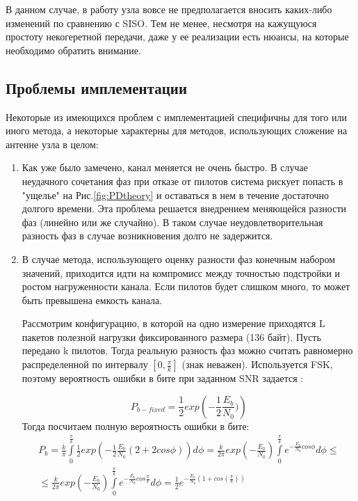 \documentclass[a4paper,12pt,oneside]{scrartcl}
\begin{document}
В данном случае, в работу узла вовсе не предполагается вносить каких-либо изменений по сравнению с SISO. Тем не менее, несмотря на кажущуюся простоту некогеретной передачи, даже у ее реализации есть нюансы, на которые необходимо обратить внимание.

\subsection{Проблемы имплементации}

Некоторые из имеющихся проблем с имплементацией специфичны для того или иного метода, а некоторые характерны для методов, использующих сложение на антенне узла в целом:
\begin{enumerate}
\item Как уже было замечено, канал меняется не очень быстро.
В случае неудачного сочетания фаз при отказе от пилотов система рискует попасть в "ущелье" на Рис.\ref{fig:PDtheory} и оставаться в нем в течение достаточно долгого времени. 
Эта проблема решается внедрением меняющейся разности фаз (линейно или же случайно).
В таком случае неудовлетворительная разность фаз в случае возникновения долго не задержится.

\item В случае метода, использующего оценку разности фаз конечным набором значений, приходится идти на компромисс между точностью подстройки и ростом нагруженности канала. Если пилотов будет слишком много, то может быть превышена емкость канала.

Рассмотрим конфигурацию, в которой на одно измерение приходятся L пакетов полезной нагрузки фиксированного размера (136 байт). 
Пусть передано k пилотов. 
Тогда реальную разность фаз можно считать равномерно распределенной по интервалу $\left[0, \frac{\pi}{k}\right]$ (знак неважен). 
Используется FSK, поэтому вероятность ошибки в бите при заданном SNR задается \cite{B2}:

\begin{equation}
P_{b-fixed} = \frac{1}{2}exp\left(-\frac{1}{2}\frac{E_b}{N_0})\right)
\label{eq:FSKBER}
\end{equation}
Тогда посчитаем полную вероятность ошибки в бите:
\begin{equation}
\begin{gathered}
P_b = \frac{k}{\pi}\int\limits_0^\frac{\pi}{k}\frac{1}{2}exp(-\frac{1}{2}\frac{E_b}{N_0}(2+2cos\phi))d\phi = \frac{k}{2\pi}exp(-\frac{E_b}{N_0})\int\limits_0^\frac{\pi}{k}e^{-\frac{E_b}{N_0}cos\phi}d\phi \leq \\
\leq \frac{k}{2\pi}exp(-\frac{E_b}{N_0})\int\limits_0^\frac{\pi}{k}e^{-\frac{E_b}{N_0}cos\frac{\pi}{k}}d\phi = \frac{1}{2}e^{-\frac{E_b}{N_0}(1+cos(\frac{\pi}{k}))}
\end{gathered}
\label{eq:FullBER}
\end{equation}


\end{enumerate}
\end{document}
